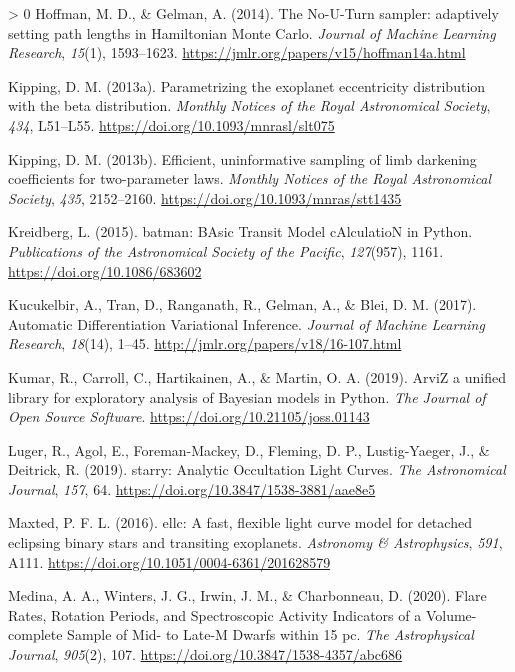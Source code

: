 \documentclass[10pt,a4paper,onecolumn]{article}
\newlength{\cslhangindent}
\newenvironment{CSLReferences}[3] %
 {%
  \setlength{\parindent}{0pt}
  \ifodd #1 \everypar{\setlength{\hangindent}{\cslhangindent}}\ignorespaces\fi
  \ifnum #2 > 0
  \setlength{\parskip}{#2\baselineskip}
  \fi
 }%
 {}
\begin{document}
\begin{CSLReferences}{1}{0}
\leavevmode\hypertarget{ref-hoffman14}{}%
Hoffman, M. D., \& Gelman, A. (2014). {The No-U-Turn sampler: adaptively
setting path lengths in Hamiltonian Monte Carlo}. \emph{Journal of
Machine Learning Research}, \emph{15}(1), 1593--1623.
\url{https://jmlr.org/papers/v15/hoffman14a.html}

\leavevmode\hypertarget{ref-kipping13b}{}%
Kipping, D. M. (2013a). {Parametrizing the exoplanet eccentricity
distribution with the beta distribution.} \emph{Monthly Notices of the
Royal Astronomical Society}, \emph{434}, L51--L55.
\url{https://doi.org/10.1093/mnrasl/slt075}

\leavevmode\hypertarget{ref-kipping13}{}%
Kipping, D. M. (2013b). {Efficient, uninformative sampling of limb
darkening coefficients for two-parameter laws}. \emph{Monthly Notices of
the Royal Astronomical Society}, \emph{435}, 2152--2160.
\url{https://doi.org/10.1093/mnras/stt1435}

\leavevmode\hypertarget{ref-kreidberg15}{}%
Kreidberg, L. (2015). {batman: BAsic Transit Model cAlculatioN in
Python}. \emph{Publications of the Astronomical Society of the Pacific},
\emph{127}(957), 1161. \url{https://doi.org/10.1086/683602}

\leavevmode\hypertarget{ref-kucukelbir17}{}%
Kucukelbir, A., Tran, D., Ranganath, R., Gelman, A., \& Blei, D. M.
(2017). {Automatic Differentiation Variational Inference}. \emph{Journal
of Machine Learning Research}, \emph{18}(14), 1--45.
\url{http://jmlr.org/papers/v18/16-107.html}

\leavevmode\hypertarget{ref-arviz}{}%
Kumar, R., Carroll, C., Hartikainen, A., \& Martin, O. A. (2019).
{ArviZ} a unified library for exploratory analysis of {Bayesian} models
in {Python}. \emph{The Journal of Open Source Software}.
\url{https://doi.org/10.21105/joss.01143}

\leavevmode\hypertarget{ref-luger19}{}%
Luger, R., Agol, E., Foreman-Mackey, D., Fleming, D. P., Lustig-Yaeger,
J., \& Deitrick, R. (2019). {starry: Analytic Occultation Light Curves}.
\emph{The Astronomical Journal}, \emph{157}, 64.
\url{https://doi.org/10.3847/1538-3881/aae8e5}

\leavevmode\hypertarget{ref-maxted16}{}%
Maxted, P. F. L. (2016). {ellc: A fast, flexible light curve model for
detached eclipsing binary stars and transiting exoplanets}.
\emph{Astronomy \& Astrophysics}, \emph{591}, A111.
\url{https://doi.org/10.1051/0004-6361/201628579}

\leavevmode\hypertarget{ref-medina20}{}%
Medina, A. A., Winters, J. G., Irwin, J. M., \& Charbonneau, D. (2020).
{Flare Rates, Rotation Periods, and Spectroscopic Activity Indicators of
a Volume-complete Sample of Mid- to Late-M Dwarfs within 15 pc}.
\emph{The Astrophysical Journal}, \emph{905}(2), 107.
\url{https://doi.org/10.3847/1538-4357/abc686}


\end{CSLReferences}
\end{document}
